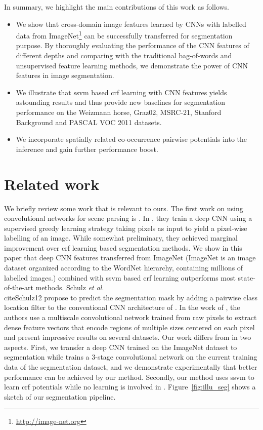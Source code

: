 \documentclass[10pt,3p]{elsarticle}
\def\onedot{.\xspace}
\def\etal{\emph{et al}\onedot}
\newcommand{\ssvm}{{\sc ssvm}\xspace}
\newcommand{\crf}{{\sc crf}\xspace}
\begin{document}
In summary, we highlight the main contributions of this work as follows.
\begin{itemize}
\item 
We show that cross-domain image features learned by CNNs with labelled data from
ImageNet\footnote{\url{http://image-net.org}} can be successfully transferred for segmentation purpose.
By thoroughly evaluating the performance of the CNN features of different depths and comparing with the traditional bag-of-words and unsupervised feature learning methods, we demonstrate the power of CNN features in image segmentation.
\item 
We illustrate that \ssvm based \crf learning with CNN features yields astounding results and thus provide new baselines for segmentation performance on the Weizmann horse, Graz02, MSRC-21, Stanford Background and PASCAL VOC 2011 datasets.
\item 
We incorporate spatially related co-occurrence pairwise potentials into the inference and gain further performance boost.
%


\end{itemize}





\section{Related work}
We briefly review some work that is relevant to ours.
The first work on using convolutional networks for scene parsing is \cite{Grangier09}.
In \cite{Grangier09}, they train a deep CNN using a supervised greedy learning strategy taking pixels as input to yield a pixel-wise labelling of an image. While somewhat preliminary, they achieved marginal improvement over \crf learning based segmentation methods. We show in this paper that deep CNN features transferred from ImageNet (ImageNet is an image dataset organized according to the WordNet hierarchy, containing millions of labelled images.) combined with \ssvm based \crf learning outperforms most state-of-the-art methods.
Schulz \etal \\cite{Schulz12} propose to predict the segmentation mask by adding a pairwise class location filter to the conventional CNN architecture of \cite{Lecun98}. In the work of \cite{Lecun13}, the authors use a multiscale convolutional network trained from raw pixels to extract dense feature vectors that encode regions of multiple sizes centered on each pixel and present impressive results on several datasets.
Our work differs from \cite{Lecun13} in two aspects. First, we transfer a deep CNN trained on the ImageNet \cite{deepCNN12} dataset  to segmentation while \cite{Lecun13} trains a 3-stage convolutional network \cite{Lecun98} on the current training data of the segmentation dataset, and we demonstrate experimentally that better performance can be achieved by our method.
Secondly, our method uses \ssvm to learn \crf potentials while no learning is involved in \cite{Lecun13}.
Figure~\ref{fig:illu_seg} shows a sketch of our segmentation pipeline.
\end{document}
